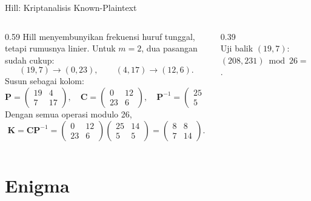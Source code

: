 \documentclass[aspectratio=169,11pt]{beamer}
\begin{document}
\begin{frame}{Hill: Kriptanalisis Known-Plaintext}
    \begin{columns}[T,onlytextwidth]
        \begin{column}{0.59\textwidth}
            \footnotesize
            Hill menyembunyikan frekuensi huruf tunggal, tetapi rumusnya
            linier. Untuk $m=2$, dua pasangan sudah cukup:
            \[
                (19,7)\rightarrow(0,23),
                \qquad
                (4,17)\rightarrow(12,6).
            \]
            Susun sebagai kolom:
            \[
                \mathbf{P}=\begin{pmatrix}19&4\\7&17\end{pmatrix},
                \quad
                \mathbf{C}=\begin{pmatrix}0&12\\23&6\end{pmatrix},
                \quad
                \mathbf{P}^{-1}=\begin{pmatrix}25&14\\5&5\end{pmatrix}.
            \]
            Dengan semua operasi modulo 26,
            \[
                \mathbf{K}=\mathbf{C}\mathbf{P}^{-1}
                =\begin{pmatrix}0&12\\23&6\end{pmatrix}
                \begin{pmatrix}25&14\\5&5\end{pmatrix}
                =\begin{pmatrix}8&8\\7&14\end{pmatrix}.
            \]
        \end{column}
        \begin{column}{0.39\textwidth}
            \centering
            \\
            {\scriptsize Uji balik $(19,7)$:
            $(208,231)\bmod26=(0,23)$.}
        \end{column}
    \end{columns}
\end{frame}

\section{Enigma}
\end{document}
